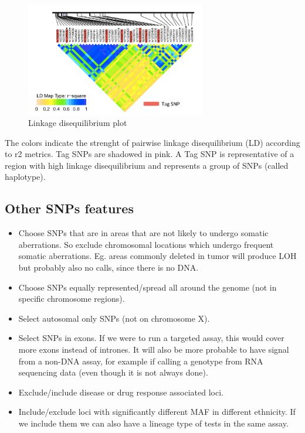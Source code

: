 \begin{figure}
	\centering
	\includegraphics[width=0.7\textwidth]{LD_plot.PNG}
	\caption{\label{fig:LD_plot}Linkage disequilibrium plot}
\end{figure}

The colors indicate the strenght of pairwise linkage disequilibrium (LD) according to r2 metrics. 
Tag SNPs are shadowed in pink. A Tag SNP is representative of a region with high linkage disequilibrium and represents a group of SNPs (called haplotype).


\subsection*{Other SNPs features} 
\begin{itemize}
	\item Choose SNPs that are in areas that are not likely to undergo somatic aberrations. So exclude chromosomal locations which undergo frequent somatic aberrations. Eg. areas commonly deleted in tumor will produce LOH but probably also no calls, since there is no DNA. 
	\item Choose SNPs equally represented/spread all around the genome (not in specific chromosome regions).
	\item Select autosomal only SNPs (not on chromosome X).
	\item Select SNPs in exons. If we were to run a targeted assay, this would cover more exons instead of intrones. It will also be more probable to have signal from a non-DNA assay, for example if calling a genotype from RNA sequencing data (even though it is not always done).
	\item Exclude/include disease or drug response associated loci. 
	\item Include/exclude loci with significantly different MAF in different ethnicity. If we include them we can also have a lineage type of tests in the same assay. 
\end{itemize}


